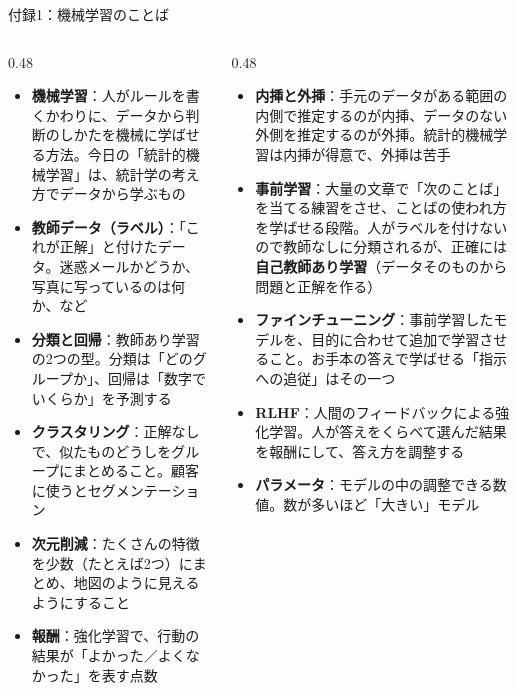 \documentclass[aspectratio=169]{beamer}
\begin{document}


\begin{frame}{付録1：機械学習のことば}
\small
\begin{columns}[t]
\begin{column}{0.48\textwidth}
\begin{itemize}\scriptsize\setlength{\itemsep}{1pt}
  \item \textbf{機械学習}：人がルールを書くかわりに、データから判断のしかたを機械に学ばせる方法。今日の「統計的機械学習」は、統計学の考え方でデータから学ぶもの
  \item \textbf{教師データ（ラベル）}：「これが正解」と付けたデータ。迷惑メールかどうか、写真に写っているのは何か、など
  \item \textbf{分類と回帰}：教師あり学習の2つの型。分類は「どのグループか」、回帰は「数字でいくらか」を予測する
  \item \textbf{クラスタリング}：正解なしで、似たものどうしをグループにまとめること。顧客に使うとセグメンテーション
  \item \textbf{次元削減}：たくさんの特徴を少数（たとえば2つ）にまとめ、地図のように見えるようにすること
  \item \textbf{報酬}：強化学習で、行動の結果が「よかった／よくなかった」を表す点数
\end{itemize}
\end{column}
\begin{column}{0.48\textwidth}
\begin{itemize}\scriptsize\setlength{\itemsep}{1pt}
  \item \textbf{内挿と外挿}：手元のデータがある範囲の内側で推定するのが内挿、データのない外側を推定するのが外挿。統計的機械学習は内挿が得意で、外挿は苦手
  \item \textbf{事前学習}：大量の文章で「次のことば」を当てる練習をさせ、ことばの使われ方を学ばせる段階。人がラベルを付けないので教師なしに分類されるが、正確には\textbf{自己教師あり学習}（データそのものから問題と正解を作る）
  \item \textbf{ファインチューニング}：事前学習したモデルを、目的に合わせて追加で学習させること。お手本の答えで学ばせる「指示への追従」はその一つ
  \item \textbf{RLHF}：人間のフィードバックによる強化学習。人が答えをくらべて選んだ結果を報酬にして、答え方を調整する
  \item \textbf{パラメータ}：モデルの中の調整できる数値。数が多いほど「大きい」モデル
\end{itemize}
\end{column}
\end{columns}
\end{frame}
\end{document}
